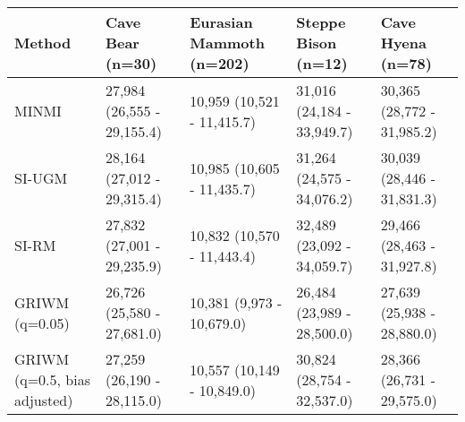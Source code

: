
\begin{tabular}{lllll}
\toprule
Method & Cave Bear (n=30) & Eurasian Mammoth (n=202) & Steppe Bison (n=12) & Cave Hyena (n=78)\\
\midrule
MINMI & 27,984 (26,555 - 29,155.4) & 10,959 (10,521 - 11,415.7) & 31,016 (24,184 - 33,949.7) & 30,365 (28,772 - 31,985.2)\\
SI-UGM & 28,164 (27,012 - 29,315.4) & 10,985 (10,605 - 11,435.7) & 31,264 (24,575 - 34,076.2) & 30,039 (28,446 - 31,831.3)\\
SI-RM & 27,832 (27,001 - 29,235.9) & 10,832 (10,570 - 11,443.4) & 32,489 (23,092 - 34,059.7) & 29,466 (28,463 - 31,927.8)\\
GRIWM (q=0.05) & 26,726 (25,580 - 27,681.0) & 10,381 (9,973 - 10,679.0) & 26,484 (23,989 - 28,500.0) & 27,639 (25,938 - 28,880.0)\\
GRIWM (q=0.5, bias adjusted) & 27,259 (26,190 - 28,115.0) & 10,557 (10,149 - 10,849.0) & 30,824 (28,754 - 32,537.0) & 28,366 (26,731 - 29,575.0)\\
\bottomrule
\end{tabular}
